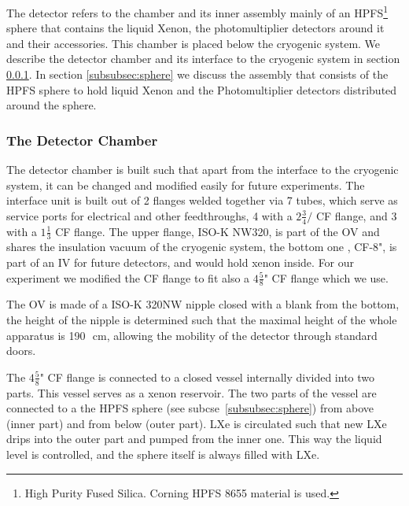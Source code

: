 The detector refers to the chamber and its inner assembly  
mainly {of} an HPFS\footnote{High Purity Fused Silica. Corning HPFS 8655 material is used.} sphere that 
contains the liquid Xenon, the photomultiplier detectors around it and their accessories. 
This chamber is placed below the cryogenic system.  
We describe the detector chamber and its interface to the cryogenic system in 
section \ref{subsubsec:detchamber}. In section \ref{subsubsec:sphere} we discuss the assembly 
that consists of the HPFS sphere to hold liquid Xenon and the Photomultiplier detectors distributed 
around the sphere.
\subsubsection{The Detector Chamber}
\label{subsubsec:detchamber}

The detector chamber is built  such  that apart from the interface to the cryogenic system, it can 
be changed and modified easily for future experiments. The interface unit is built out of 2 flanges 
welded together via 7 tubes, which serve as service ports for electrical and other feedthroughs, 4 
with a $2 \frac{3}{4}/$ CF flange, and 3 with a $1\frac{1}{3}$ CF flange. 
The upper flange, ISO-K NW320, is part of the OV and shares the insulation vacuum of the cryogenic 
system, the bottom one , CF-8", is part of an IV for future detectors, and would hold xenon inside. 
For our experiment we modified the CF flange to fit also a $4\frac{5}{8}$" CF 
flange which we use.

The OV is made of a ISO-K 320NW nipple closed with a blank from the bottom, 
the height of the nipple is determined such that the maximal height of the whole 
apparatus is 190~\,cm, allowing the mobility of the detector through standard doors.
 
The $4\frac{5}{8}$" CF flange is connected to a closed vessel internally divided into 
two parts. This vessel serves as a xenon reservoir. The two parts of the vessel are connected 
to a the HPFS sphere (see subcse~\ref{subsubsec:sphere}) from above (inner part) and from below 
(outer part). LXe is circulated such that new LXe drips into the outer part and pumped from the 
inner one. This way the liquid level is controlled, and the sphere itself is always filled with LXe. 



